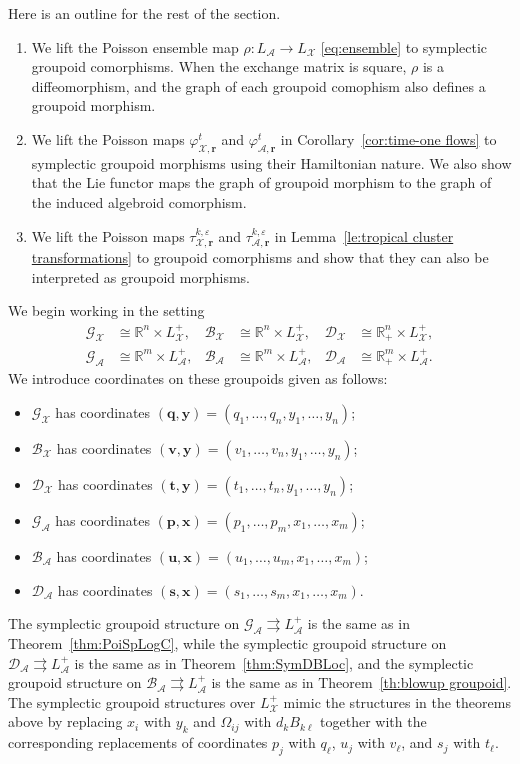 \documentclass{amsart}
\numberwithin{equation}{section}
\newcommand{\bfp}{{\boldsymbol{p}}}
\newcommand{\bfq}{{\boldsymbol{q}}}
\newcommand{\bfr}{{\boldsymbol{r}}}
\newcommand{\bfs}{{\boldsymbol{s}}}
\newcommand{\bft}{{\boldsymbol{t}}}
\newcommand{\bfu}{{\boldsymbol{u}}}
\newcommand{\bfv}{{\boldsymbol{v}}}
\newcommand{\bfx}{{\boldsymbol{x}}}
\newcommand{\bfy}{{\boldsymbol{y}}}
\newcommand{\cA}{\mathcal{A}}
\newcommand{\cB}{\mathcal{B}}
\newcommand{\cD}{\mathcal{D}}
\newcommand{\cG}{\mathcal{G}}
\newcommand{\cX}{\mathcal{X}}
\newcommand{\RR}{\mathbb{R}}
\newcommand{\rra}{\rightrightarrows}
\begin{document}
Here is an outline for the rest of the section.
\begin{enumerate}
	\item We lift the Poisson ensemble map $\rho:L_\cA\to L_\cX$ \eqref{eq:ensemble} to symplectic groupoid comorphisms. When the exchange matrix is square, $\rho$ is a diffeomorphism, and the graph of each groupoid comophism also defines a groupoid morphism.
	\item We lift the Poisson maps $\varphi_{\cX,\bfr}^t$ and $\varphi_{\cA,\bfr}^t$ in Corollary~\ref{cor:time-one flows} to symplectic groupoid morphisms using their Hamiltonian nature. We also show that the Lie functor maps the graph of groupoid morphism to the graph of the induced algebroid comorphism.
	\item We lift the Poisson maps $\tau_{\cX,\bfr}^{k,\varepsilon}$ and $\tau_{\cA,\bfr}^{k,\varepsilon}$ in Lemma~\ref{le:tropical cluster transformations} to groupoid comorphisms and show that they can also be interpreted as groupoid morphisms.
\end{enumerate}

We begin working in the setting 
\begin{align*}
  \cG_\cX&\cong\RR^n\times L^+_\cX,& \cB_\cX&\cong\RR^n\times L^+_\cX,& \cD_\cX&\cong\RR_+^n\times L^+_\cX,\\
  \cG_\cA&\cong\RR^m\times L^+_\cA,& \cB_\cA&\cong\RR^m\times L^+_\cA,& \cD_\cA&\cong\RR_+^m\times L^+_\cA.
\end{align*}
We introduce coordinates on these groupoids given as follows:
\begin{itemize}
  \item $\cG_\cX$ has coordinates $(\bfq,\bfy)=(q_1,\ldots,q_n,y_1,\ldots,y_n)$; 
  \item $\cB_\cX$ has coordinates $(\bfv,\bfy)=(v_1,\ldots,v_n,y_1,\ldots,y_n)$;
  \item $\cD_\cX$ has coordinates $(\bft,\bfy)=(t_1,\ldots,t_n,y_1,\ldots,y_n)$; 
  \item $\cG_\cA$ has coordinates $(\bfp,\bfx)=(p_1,\ldots,p_m,x_1,\ldots,x_m)$; 
  \item $\cB_\cA$ has coordinates $(\bfu,\bfx)=(u_1,\ldots,u_m,x_1,\ldots,x_m)$;
  \item $\cD_\cA$ has coordinates $(\bfs,\bfx)=(s_1,\ldots,s_m,x_1,\ldots,x_m)$.
\end{itemize}
The symplectic groupoid structure on $\cG_\cA \rra L^+_\cA$ is the same as in Theorem~\ref{thm:PoiSpLogC}, while the symplectic groupoid structure on $\cD_\cA \rra L^+_\cA$ is the same as in Theorem~\ref{thm:SymDBLoc}, and the symplectic groupoid structure on $\cB_\cA \rra L^+_\cA$ is the same as in Theorem~\ref{th:blowup groupoid}.
The symplectic groupoid structures over $L^+_\cX$ mimic the structures in the theorems above by replacing $x_i$ with $y_k$ and $\Omega_{ij}$ with $d_kB_{k\ell}$ together with the corresponding replacements of coordinates $p_j$ with $q_\ell$, $u_j$ with $v_\ell$, and $s_j$ with $t_\ell$.
\end{document}
